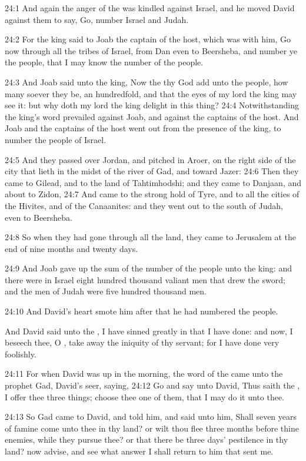 24:1 And again the anger of the \LORD was kindled against Israel, and
he moved David against them to say, Go, number Israel and Judah.

24:2 For the king said to Joab the captain of the host, which was with
him, Go now through all the tribes of Israel, from Dan even to
Beersheba, and number ye the people, that I may know the number of the
people.

24:3 And Joab said unto the king, Now the \LORD thy God add unto the
people, how many soever they be, an hundredfold, and that the eyes of
my lord the king may see it: but why doth my lord the king delight in
this thing?  24:4 Notwithstanding the king's word prevailed against
Joab, and against the captains of the host. And Joab and the captains
of the host went out from the presence of the king, to number the
people of Israel.

24:5 And they passed over Jordan, and pitched in Aroer, on the right
side of the city that lieth in the midst of the river of Gad, and
toward Jazer: 24:6 Then they came to Gilead, and to the land of
Tahtimhodshi; and they came to Danjaan, and about to Zidon, 24:7 And
came to the strong hold of Tyre, and to all the cities of the Hivites,
and of the Canaanites: and they went out to the south of Judah, even
to Beersheba.

24:8 So when they had gone through all the land, they came to
Jerusalem at the end of nine months and twenty days.

24:9 And Joab gave up the sum of the number of the people unto the
king: and there were in Israel eight hundred thousand valiant men that
drew the sword; and the men of Judah were five hundred thousand men.

24:10 And David's heart smote him after that he had numbered the
people.

And David said unto the \LORD, I have sinned greatly in that I have
done: and now, I beseech thee, O \LORD, take away the iniquity of thy
servant; for I have done very foolishly.

24:11 For when David was up in the morning, the word of the \LORD came
unto the prophet Gad, David's seer, saying, 24:12 Go and say unto
David, Thus saith the \LORD, I offer thee three things; choose thee one
of them, that I may do it unto thee.

24:13 So Gad came to David, and told him, and said unto him, Shall
seven years of famine come unto thee in thy land? or wilt thou flee
three months before thine enemies, while they pursue thee? or that
there be three days' pestilence in thy land? now advise, and see what
answer I shall return to him that sent me.

